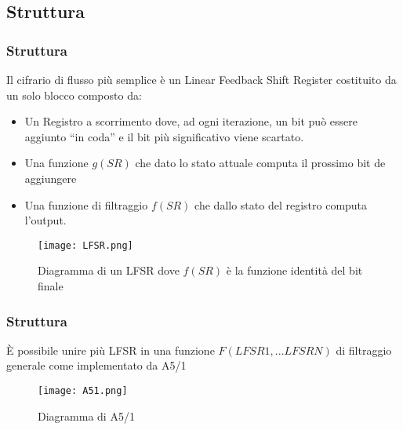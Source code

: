 \subsection{Struttura}
\begin{frame}
    \frametitle{Struttura}
    Il cifrario di flusso più semplice è un Linear Feedback Shift Register costituito da un solo blocco composto da:
    \begin{itemize}
        \item Un Registro a scorrimento dove, ad ogni iterazione, un bit può essere aggiunto ``in coda'' e il bit più significativo viene scartato.
        \item Una funzione $g(SR)$ che dato lo stato attuale computa il prossimo bit de aggiungere
        \item Una funzione di filtraggio $f(SR)$ che dallo stato del registro computa l'output.
    \end{itemize}

    \begin{figure}
        \centering
        \texttt{[image: LFSR.png]}
        \caption{Diagramma di un LFSR dove $f(SR)$ è la funzione identità del bit finale}
        \label{fig:lfsr}
    \end{figure}
\end{frame}

\begin{frame}
    \frametitle{Struttura}
    È possibile unire più LFSR in una funzione $F(LFSR1, ... LFSRN)$ di filtraggio generale come implementato da A5/1

    \begin{figure}
        \centering
        \texttt{[image: A51.png]}
        \caption{Diagramma di A5/1}
        \label{fig:a51}
    \end{figure}
\end{frame}
